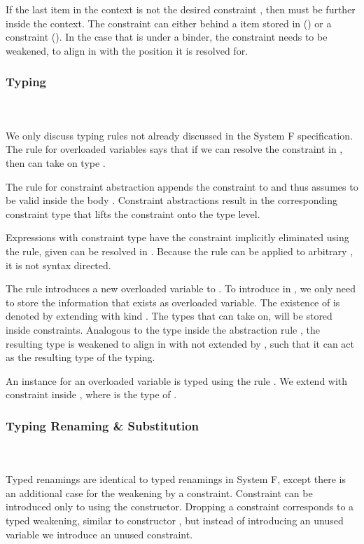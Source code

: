 \noindent If the last item in the context is not the desired constraint , then  must be further inside the context. The constraint can either behind a item stored in  () or a constraint (). In the case that  is under a binder, the constraint needs to be weakened, to align in  with the position it is resolved for. 

\subsubsection{Typing}\hfill\\\\
We only discuss typing rules not already discussed in the System F specification. 
\FoTyping
The rule for overloaded variables  says that if we can resolve the constraint  \Constr{:}  in , then  can take on type . 

\noindent The rule for constraint abstraction  appends the constraint  to  and thus assumes  to be valid inside the body . Constraint abstractions result in the corresponding constraint type \Constr{[}  \Constr{]⇒}  that lifts the constraint onto the type level.

\noindent Expressions  with constraint type \Constr{[}  \Constr{]⇒}  have the constraint implicitly eliminated using the  rule, given  can be resolved in . Because the rule can be applied to arbitrary , it is not syntax directed.

\noindent The rule  introduces a new overloaded variable  to . 
To introduce  in , we only need to store the information that  exists as overloaded variable. The existence of  is denoted by extending  with kind . The types that  can take on, will be stored inside constraints.
Analogous to the type  inside the abstraction rule , the resulting type  is weakened to align in  with  not extended by , such that it can act as the resulting type of the typing.

\noindent An instance for an overloaded variable  is typed using the rule . We extend  with constraint  \Constr{:}  inside , where  is the type of . 

\subsubsection{Typing Renaming \& Substitution}\hfill\\\\
Typed renamings are identical to typed renamings in System F, except there is an additional case for the weakening by a constraint. 
\FoRenTyping
Constraint  \Constr{:}  can be introduced only to  using the  constructor. 
Dropping a constraint corresponds to a typed weakening, similar to constructor , but instead of introducing an unused variable we introduce an unused constraint.

